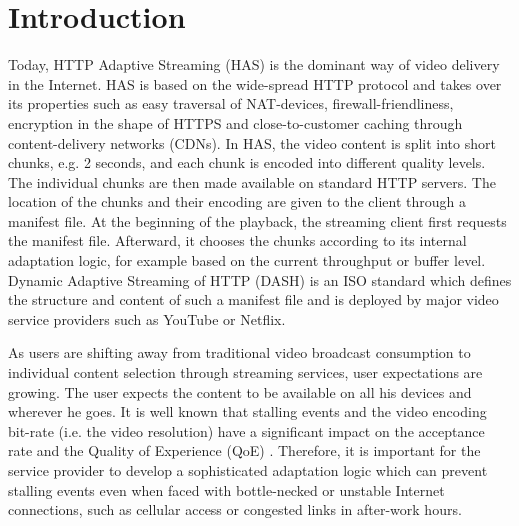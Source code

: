 
\section{Introduction}
\label{sec:introduction}

Today, HTTP Adaptive Streaming (HAS) is the dominant way of video delivery in the Internet. 
HAS is based on the wide-spread HTTP protocol and takes over its properties such as easy traversal of NAT-devices, firewall-friendliness, encryption in the shape of HTTPS and close-to-customer caching through content-delivery networks (CDNs).
In HAS, the video content is split into short chunks, e.g. 2 seconds, and each chunk is encoded into different quality levels.
The individual chunks are then made available on standard HTTP servers.
The location of the chunks and their encoding are given to the client through a manifest file.
At the beginning of the playback, the streaming client first requests the manifest file. 
Afterward, it chooses the chunks according to its internal adaptation logic, for example based on the current throughput or buffer level.
Dynamic Adaptive Streaming of HTTP (DASH) is an ISO standard which defines the structure and content of such a manifest file and is deployed by major video service providers such as YouTube or Netflix.

As users are shifting away from traditional video broadcast consumption to individual content selection through streaming services, user expectations are growing. 
The user expects the content to be available on all his devices and wherever he goes. 
It is well known that stalling events and the video encoding bit-rate (i.e. the video resolution) have a significant impact on the acceptance rate and the Quality of Experience (QoE) \cite{casas2012youtube}.
Therefore, it is important for the service provider to develop a sophisticated adaptation logic which can prevent stalling events even when faced with bottle-necked or unstable Internet connections, such as cellular access or congested links in after-work hours.

